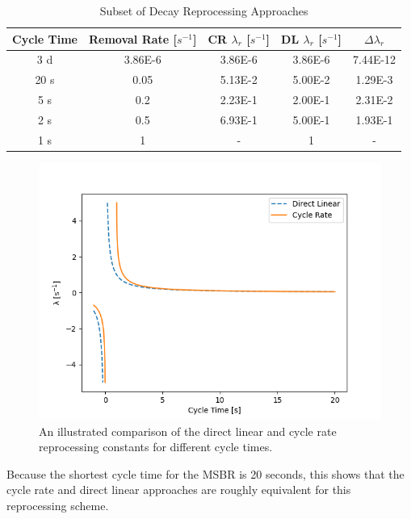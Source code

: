 \begin{table}[H]
\renewcommand{\arraystretch}{1.25}
\caption{Subset of Decay Reprocessing Approaches}
\label{tab:repr_decay_view}
\begin{center}
\begin{tabular}{ c | c | c | c | c }
 \hline
 Cycle Time & Removal Rate [$s^{-1}$] & CR $\lambda_{r}$ [$s^{-1}$] & DL $\lambda_{r}$ [$s^{-1}$] & $\Delta \lambda_{r}$\\
 \hline
 \hline
 3 d & 3.86E-6 & 3.86E-6 & 3.86E-6 & 7.44E-12\\
 20 s & 0.05 & 5.13E-2 & 5.00E-2 & 1.29E-3\\
 5 s & 0.2 & 2.23E-1 & 2.00E-1 & 2.31E-2\\
 2 s & 0.5 & 6.93E-1 & 5.00E-1 & 1.93E-1\\
 1 s & 1 & - & 1 & -\\
 \hline
\end{tabular}
\end{center}
\end{table}

\begin{figure}[H]
  \centering
  \includegraphics[scale=0.55]{images/dl_cr_asymptote.png}
  \caption{An illustrated comparison of the direct linear and cycle rate reprocessing constants for different cycle times.}
   \label{fig:dl_cr_asymptotic}
\end{figure}

Because the shortest cycle time for the MSBR is 20 seconds, this shows that the cycle rate and direct linear approaches are roughly equivalent for this reprocessing scheme.

